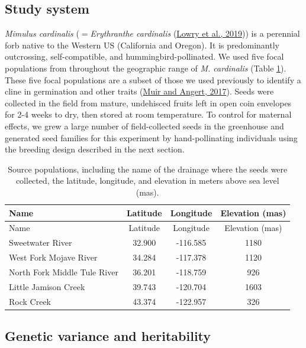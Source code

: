 \documentclass[
  12pt,
]{article}
\begin{document}
\hypertarget{study-system}{%
\subsection{Study system}\label{study-system}}

\emph{Mimulus cardinalis} (\(=\)\emph{Erythranthe cardinalis} (\protect\hyperlink{ref-lowry_case_2019}{Lowry et al., 2019})) is a perennial forb native to the Western US (California and Oregon). It is predominantly outcrossing, self-compatible, and hummingbird-pollinated. We used five focal populations from throughout the geographic range of \emph{M. cardinalis} (Table \ref{tab:focal_pops}). These five focal populations are a subset of those we used previously to identify a cline in germination and other traits (\protect\hyperlink{ref-muir_grow_2017}{Muir and Angert, 2017}). Seeds were collected in the field from mature, undehisced fruits left in open coin envelopes for 2-4 weeks to dry, then stored at room temperature. To control for maternal effects, we grew a large number of field-collected seeds in the greenhouse and generated seed families for this experiment by hand-pollinating individuals using the breeding design described in the next section.

\begin{longtable}[]{@{}lccc@{}}
\caption{\label{tab:focal_pops} Source populations, including the name of the drainage where the seeds were collected, the latitude, longitude, and elevation in meters above sea level (mas).}\tabularnewline
\toprule
Name & Latitude & Longitude & Elevation (mas) \\
\midrule
\endfirsthead
\toprule
Name & Latitude & Longitude & Elevation (mas) \\
\midrule
\endhead
Sweetwater River & 32.900 & -116.585 & 1180 \\
West Fork Mojave River & 34.284 & -117.378 & 1120 \\
North Fork Middle Tule River & 36.201 & -118.759 & 926 \\
Little Jamison Creek & 39.743 & -120.704 & 1603 \\
Rock Creek & 43.374 & -122.957 & 326 \\
\bottomrule
\end{longtable}

\hypertarget{genetic-variance-and-heritability}{%
\subsection{Genetic variance and heritability}\label{genetic-variance-and-heritability}}
\end{document}
